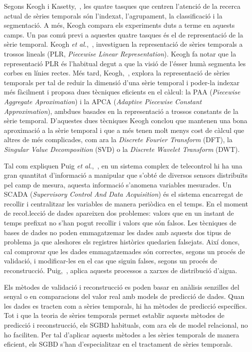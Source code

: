 Segons Keogh i Kasetty,~\cite{keogh02}, les quatre tasques que centren l'atenció de la recerca actual de sèries temporals són l'indexat, l'agrupament, la classificació i la segmentació. A més, Keogh compara els experiments duts a terme en aquests camps.
Un pas comú previ a aquestes quatre tasques és el de representació de la sèrie temporal. 
Keogh \emph{et al.},~\cite{keogh97,keogh98}, investiguen la representació de sèries temporals a trossos lineals (PLR, \emph{Piecewise Linear Representation}). Keogh fa notar que la representació PLR és l'habitual degut a que la visió de l'ésser humà segmenta les corbes en línies rectes.
Més tard, Keogh,~\cite{keogh00,keogh01}, explora la representació de sèries temporals per tal de reduir la dimensió d'una sèrie temporal i poder-la indexar més fàcilment  i proposa dues tècniques eficients en el càlcul: la PAA (\emph{Piecewise Aggregate Aproximation}) i  la APCA (\emph{Adaptive Piecewise Constant Approximation}), ambdues basades en la representació a trossos constants de la sèrie temporal. 
D'aquestes dues tècniques Keogh conclou que mantenen una bona aproximació a la sèrie temporal i que a més  tenen molt menys cost de càlcul que altres de més complicades, com ara la \emph{Discrete Fourier Transform} (DFT),  la  \emph{Singular Value Decomposition} (SVD) o la \emph{Discrete Wavelet Transform} (DWT).



Tal com expliquen Puig \emph{et al.},~\cite{puig10}, en un sistema complex de telecontrol hi ha una gran quantitat d'informació a manipular que s'obté de diversos sensors distribuïts pel camp de mesura, aquesta informació s'anomena variables mesurades. Un SCADA (\emph{Supervisory Control And Data Acquisition})  és el sistema encarregat de recollir i centralitzar les variables de manera periòdica en el temps. En el moment de reco\l.lecció de dades apareixen dos problemes: valors que en un instant de temps prefixat no s'han pogut recollir i valors que són falsos. Les tècniques de bases de dades no poden emmagatzemar les dades amb aquests dos tipus de problema ja que aleshores els registres històrics quedarien falsejats. Així doncs, cal comprovar que les dades emmagatzemades són correctes, segons un procés de validació, i modificar-les en el cas que siguin falses, segons un procés de reconstrucció. Puig,~\cite{puig10}, aplica aquests processos a xarxes de distribució d'aigua.

Els mètodes de validació i reconstrucció es poden basar en anàlisis senzilles del senyal o en comparacions del valor real amb models de predicció de dades. Quan les dades es tracten com a sèries temporals, hi ha mètodes de predicció específics.
Tot i que la teoria de sèries temporals permet establir aquests mètodes de predicció i reconstrucció, els SGBD habituals, com ara els de model relacional, no ho faciliten.  
Per tal d'aplicar aquests mètodes a les sèries temporals de manera eficient, els SGBD s'han d'especialitzar en el tractament de sèries temporals.



